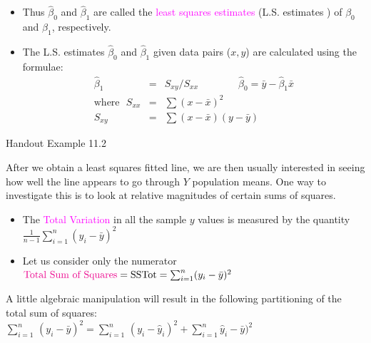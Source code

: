 \documentclass[xcolor=dvipsnames,12pt]{beamer}
\begin{document}
\begin{frame}
\begin{itemize}
\item Thus $\hat{\beta}_0$ and $\hat{\beta}_1$ are called the   \textcolor{magenta}{least
squares estimates}  (L.S. estimates ) of $\beta_0$ and 
$\beta_1$, respectively.\\[.1in]
\item The  L.S. estimates $\hat{\beta}_0$ and $\hat{\beta}_1$
given data pairs ($x,y$) are calculated using the formulae:
\begin{eqnarray*}
  \hat{\beta}_1 &=& S_{xy}/S_{xx} \qquad \qquad \hat{\beta}_0 = \bar{y} -
                             \hat{\beta}_1 \bar{x} \\[.1in]
\mbox{where}  \ \ \   S_{xx} & = & \sum(x-\bar{x})^2\\
    S_{xy} &=& \sum(x-\bar{x})(y-\bar{y})
\end{eqnarray*}
\end{itemize}
\end{frame}


\begin{frame}
Handout Example 11.2
\end{frame}



\begin{frame}
After we obtain a least squares fitted line, we are then usually
interested in seeing how well the line appears to go through $Y$
population means.  One way to investigate this is to look at
relative magnitudes of certain sums of squares.  
\begin{itemize}
\item The  \textcolor{magenta}{Total Variation} in all the sample $y$ values is
measured by the quantity $\frac{1}{n-1} \sum_{i=1}^n (y_{i} - \bar{y})^2 $
\item Let us consider only  the numerator\\[.1in]
 $\mbox{\textcolor{magenta}{Total~Sum~of~Squares}} = \mbox{SSTot}= \sum_{i=1}^n (y_{i} -  \bar{y})^2$\\[.1in]
 \end{itemize}
A little algebraic manipulation will result in the following partitioning of the total sum of squares:\\[.1in]
 $\sum_{i=1}^n\, (y_{i} - \bar{y})^2 =\sum_{i=1}^n \, (y_{i} - \hat{y}_i)^2 +\sum_{i=1}^n  \hat{y}_i - \bar{y})^2$
\end{frame}
\end{document}
